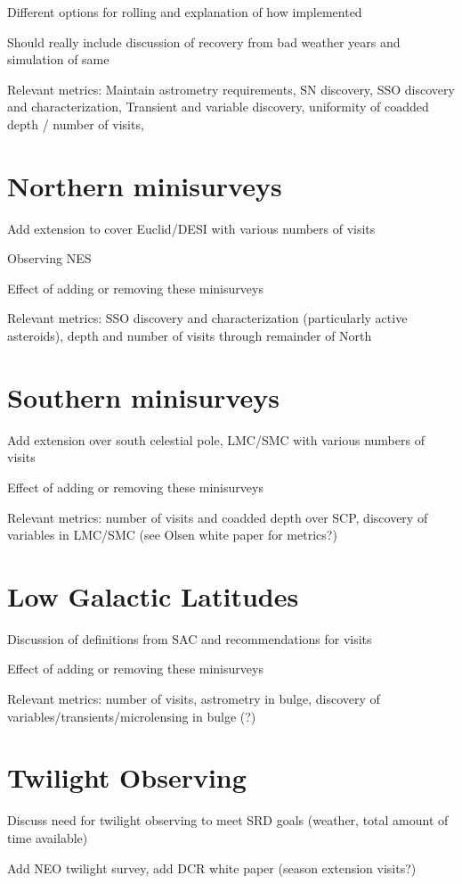 Different options for rolling and explanation of how implemented

Should really include discussion of recovery from bad weather years and simulation of same

Relevant metrics: Maintain astrometry requirements, SN discovery, SSO discovery and characterization,  Transient and variable discovery, uniformity of coadded depth / number of visits, 

\section{Northern minisurveys}
Add extension to cover Euclid/DESI with various numbers of visits

Observing NES 

Effect of adding or removing these minisurveys

Relevant metrics: SSO discovery and characterization (particularly active asteroids), depth and number of visits through remainder of North

\section{Southern minisurveys}
Add extension over south celestial pole, LMC/SMC with various numbers of visits

Effect of adding or removing these minisurveys

Relevant metrics: number of visits and coadded depth over SCP, discovery of variables in LMC/SMC (see Olsen white paper for metrics?)

\section{Low Galactic Latitudes}
Discussion of definitions from SAC and recommendations for visits

Effect of adding or removing these minisurveys

Relevant metrics: number of visits, astrometry in bulge, discovery of variables/transients/microlensing in bulge (?)

\section{Twilight Observing}
Discuss need for twilight observing to meet SRD goals (weather, total amount of time available)

Add NEO twilight survey, add DCR white paper (season extension visits?)

